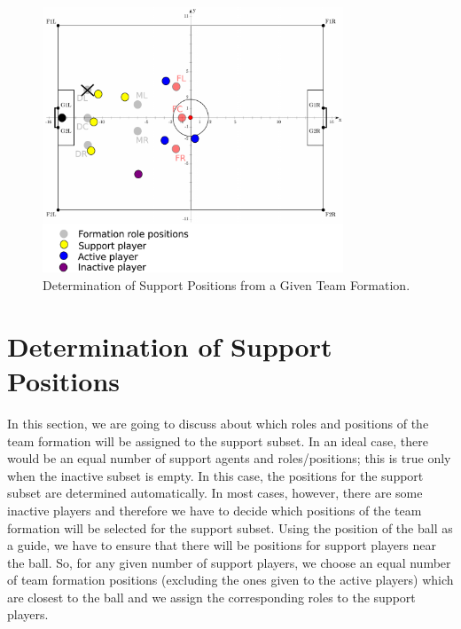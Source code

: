 \begin{figure}[t!]
\centering
  \includegraphics[width=0.8\textwidth]{Chapter4/figures/SupportPos.pdf}
  \caption{Determination of Support Positions from a Given Team Formation.} 
  \label{fig:SupportPos}
\end{figure}

\section{Determination of Support Positions}
In this section, we are going to discuss about which roles and positions of the team formation will be assigned to the support subset. In an ideal case, there would be an equal number of support agents and roles/positions; this is true only when the inactive subset is empty. In this case, the positions for the support subset are determined automatically. In most cases, however, there are some inactive players and therefore we have to decide which positions of the team formation will be selected for the support subset. Using the position of the ball as a guide, we have to ensure that there will be positions for support players near the ball. So, for any given number of support players, we choose an equal number of team formation positions (excluding the ones given to the active players) which are closest to the ball and we assign the corresponding roles to the support players. 





